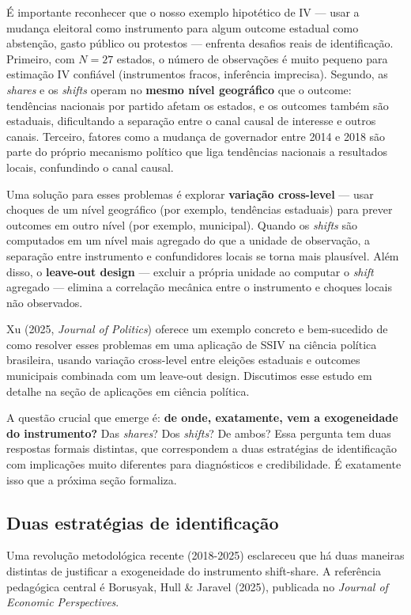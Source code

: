 \documentclass[
]{article}
\begin{document}
É importante reconhecer que o nosso exemplo hipotético de IV --- usar a mudança eleitoral como instrumento para algum outcome estadual como abstenção, gasto público ou protestos --- enfrenta desafios reais de identificação. Primeiro, com \(N = 27\) estados, o número de observações é muito pequeno para estimação IV confiável (instrumentos fracos, inferência imprecisa). Segundo, as \emph{shares} e os \emph{shifts} operam no \textbf{mesmo nível geográfico} que o outcome: tendências nacionais por partido afetam os estados, e os outcomes também são estaduais, dificultando a separação entre o canal causal de interesse e outros canais. Terceiro, fatores como a mudança de governador entre 2014 e 2018 são parte do próprio mecanismo político que liga tendências nacionais a resultados locais, confundindo o canal causal.

Uma solução para esses problemas é explorar \textbf{variação cross-level} --- usar choques de um nível geográfico (por exemplo, tendências estaduais) para prever outcomes em outro nível (por exemplo, municipal). Quando os \emph{shifts} são computados em um nível mais agregado do que a unidade de observação, a separação entre instrumento e confundidores locais se torna mais plausível. Além disso, o \textbf{leave-out design} --- excluir a própria unidade ao computar o \emph{shift} agregado --- elimina a correlação mecânica entre o instrumento e choques locais não observados.

Xu (2025, \emph{Journal of Politics}) oferece um exemplo concreto e bem-sucedido de como resolver esses problemas em uma aplicação de SSIV na ciência política brasileira, usando variação cross-level entre eleições estaduais e outcomes municipais combinada com um leave-out design. Discutimos esse estudo em detalhe na seção de aplicações em ciência política.

A questão crucial que emerge é: \textbf{de onde, exatamente, vem a exogeneidade do instrumento?} Das \emph{shares}? Dos \emph{shifts}? De ambos? Essa pergunta tem duas respostas formais distintas, que correspondem a duas estratégias de identificação com implicações muito diferentes para diagnósticos e credibilidade. É exatamente isso que a próxima seção formaliza.

\subsection{Duas estratégias de identificação}\label{duas-estratuxe9gias-de-identificauxe7uxe3o}

Uma revolução metodológica recente (2018-2025) esclareceu que há duas maneiras distintas de justificar a exogeneidade do instrumento shift-share. A referência pedagógica central é Borusyak, Hull \& Jaravel (2025), publicada no \emph{Journal of Economic Perspectives}.
\end{document}
